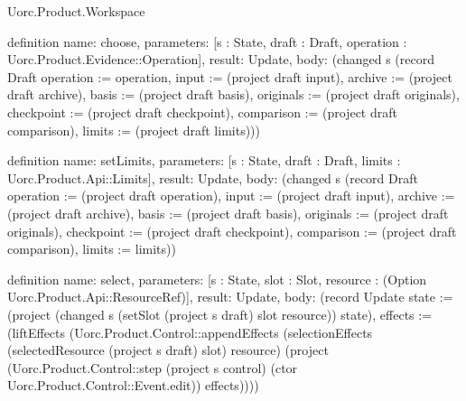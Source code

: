 \begin{lexlean}{Uorc.Product.Workspace}
\begin{semanticmodule}
definition{
  name: choose,
  parameters: [s : State, draft : Draft, operation : Uorc.Product.Evidence::Operation],
  result: Update,
  body: (changed s (record Draft {operation := operation, input := (project draft input), archive := (project draft archive), basis := (project draft basis), originals := (project draft originals), checkpoint := (project draft checkpoint), comparison := (project draft comparison), limits := (project draft limits)}))
}

definition{
  name: setLimits,
  parameters: [s : State, draft : Draft, limits : Uorc.Product.Api::Limits],
  result: Update,
  body: (changed s (record Draft {operation := (project draft operation), input := (project draft input), archive := (project draft archive), basis := (project draft basis), originals := (project draft originals), checkpoint := (project draft checkpoint), comparison := (project draft comparison), limits := limits}))
}

definition{
  name: select,
  parameters: [s : State, slot : Slot, resource : (Option Uorc.Product.Api::ResourceRef)],
  result: Update,
  body: (record Update {state := (project (changed s (setSlot (project s draft) slot resource)) state), effects := (liftEffects (Uorc.Product.Control::appendEffects (selectionEffects (selectedResource (project s draft) slot) resource) (project (Uorc.Product.Control::step (project s control) (ctor Uorc.Product.Control::Event.edit)) effects)))})
}


\end{semanticmodule}
\end{lexlean}
